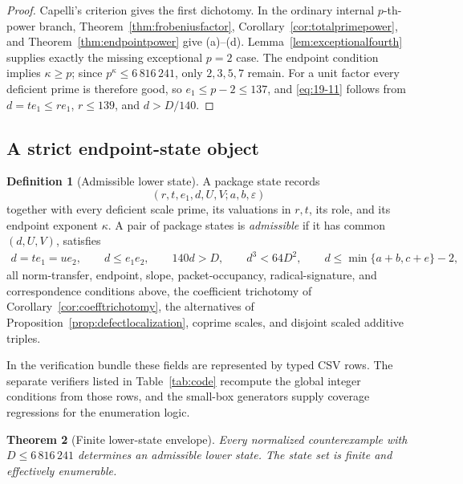 \documentclass[11pt]{article}
\numberwithin{equation}{section}
\newtheorem{theorem}{Theorem}[section]
\theoremstyle{definition}
\newtheorem{definition}[theorem]{Definition}
\begin{document}
\begin{proof}
Capelli's criterion gives the first dichotomy.  In the ordinary internal
\(p\)-th-power branch, Theorem~\ref{thm:frobeniusfactor},
Corollary~\ref{cor:totalprimepower}, and Theorem~\ref{thm:endpointpower}
give (a)--(d).  Lemma~\ref{lem:exceptionalfourth} supplies exactly the
missing exceptional \(p=2\) case.  The endpoint condition implies
\(\kappa\geq p\); since \(p^\kappa\leq6\,816\,241\), only
\(2,3,5,7\) remain.  For a unit factor every deficient prime is therefore
good, so \(e_1\leq p-2\leq137\), and \eqref{eq:19-11} follows from
\(d=te_1\leq re_1\), \(r\leq139\), and \(d>D/140\).
\end{proof}

\subsection{A strict endpoint-state object}

\begin{definition}[Admissible lower state]\label{def:endpointstate}
A package state records
\[
 (r,t,e_1,d,U,V;a,b,\varepsilon)
\]
together with every deficient scale prime, its valuations in \(r,t\), its
role, and its endpoint exponent \(\kappa\).  A pair of package states is
\emph{admissible} if it has common \((d,U,V)\), satisfies
\begin{gather}
 d=te_1=ue_2,\qquad d\leq e_1e_2,
 \qquad 140d>D,
 \qquad d^3<64D^2,
 \qquad d\leq\min\{a+b,c+e\}-2,\label{eq:19-12}
\end{gather}
all norm-transfer, endpoint, slope, packet-occupancy, radical-signature, and
correspondence conditions above, the coefficient trichotomy of
Corollary~\ref{cor:coefftrichotomy}, the alternatives of
Proposition~\ref{prop:defectlocalization}, coprime scales, and disjoint scaled
additive triples.
\end{definition}

In the verification bundle these fields are represented by typed CSV rows.  The
separate verifiers listed in Table~\ref{tab:code} recompute the global integer
conditions from those rows, and the small-box generators supply coverage
regressions for the enumeration logic.

\begin{theorem}[Finite lower-state envelope]\label{thm:lowerstatereduction}
Every normalized counterexample with \(D\leq6\,816\,241\) determines an
admissible lower state.  The state set is finite and effectively enumerable.
\end{theorem}
\end{document}
